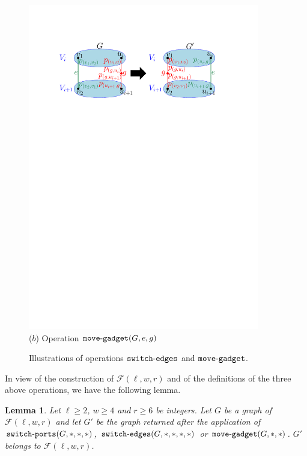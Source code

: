 \documentclass[11pt]{article}
\newtheorem{lemma}{Lemma}[section]
\begin{document}
\begin{figure}[!t]
\begin{center}
\begin{minipage}[t]{0.49\linewidth}
	\includegraphics[width=0.9\textwidth]{images/move-gadget.pdf}\\
    {\footnotesize ($b$) Operation ${\tt move\mbox{-}gadget}(G,e,g)$}
  \end{minipage}
\end{center}
 \caption{Illustrations of operations ${\tt switch\mbox{-}edges}$ and ${\tt move\mbox{-}gadget}$.}
\label{fig:switchmove}
\end{figure}

In view of the construction of $\mathcal{F}(\ell,w,r)$ and of the definitions of the three above operations, we have the following lemma.

\begin{lemma}\label{lem:modifGraph}
Let $\ell\geq 2$, $w\geq 4$ and $r\geq 6$ be integers. Let $G$ be a graph of $\mathcal{F}(\ell,w,r)$ and let $G'$ be the graph returned after the application of ${\tt switch\mbox{-}ports}(G,*,*,*)$, ${\tt switch\mbox{-}edges}(G,*,*,*,*)$ or ${\tt move\mbox{-}gadget}(G,*,*)$. $G'$ belongs to $\mathcal{F}(\ell,w,r)$.
\end{lemma}
\end{document}
